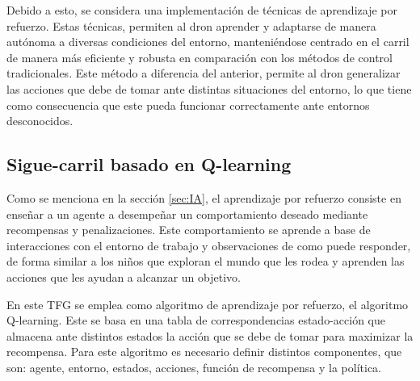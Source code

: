 Debido a esto, se considera una implementación de técnicas de aprendizaje por refuerzo. Estas técnicas, 
permiten al dron aprender y adaptarse de manera autónoma a diversas condiciones del entorno, manteniéndose centrado en el carril de manera más eficiente y robusta en comparación 
con los métodos de control tradicionales. Este método a diferencia del anterior, permite al dron generalizar las acciones que debe de tomar ante distintas situaciones del entorno, lo que tiene
como consecuencia que este pueda funcionar correctamente ante entornos desconocidos.
  \subsection{Sigue-carril basado en Q-learning}
  \label{sec:Q-learning}

  Como se menciona en la sección \ref{sec:IA}, el aprendizaje por refuerzo consiste en enseñar a un agente a
  desempeñar un comportamiento deseado mediante recompensas y penalizaciones. Este comportamiento se aprende a base de interacciones con el entorno de trabajo y observaciones de como puede responder,
  de forma similar a los niños que exploran el mundo que les rodea y aprenden las acciones que les ayudan a alcanzar un objetivo. 

  En este TFG se emplea como algoritmo de aprendizaje por refuerzo, el algoritmo Q-learning. Este se basa en una tabla de correspondencias estado-acción que almacena ante distintos estados 
  la acción que se debe de tomar para maximizar la recompensa. Para este algoritmo es necesario definir distintos componentes, que son: agente, entorno, estados, acciones, función de recompensa y 
  la política.
  
